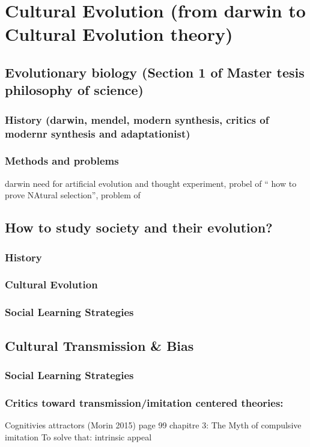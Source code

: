 \documentclass[12pt, b5paper,twoside]{tesi_upf}
\begin{document}
\section{Cultural Evolution (from darwin to Cultural Evolution theory)}
\subsection{ Evolutionary biology (Section 1 of Master tesis philosophy of science)}
\subsubsection{ History (darwin, mendel, modern synthesis, critics of modernr synthesis and adaptationist)}
\subsubsection{Methods and problems}
darwin need for artificial evolution and thought experiment, probel of `` how to prove NAtural selection'', problem of 
\subsection{How to study society and their evolution?}
\subsubsection{History}
\subsubsection{Cultural Evolution}
\subsubsection{Social Learning Strategies }
\subsection{Cultural Transmission \& Bias}
\subsubsection{ Social Learning Strategies}
\subsubsection{Critics toward transmission/imitation centered theories:}
Cognitivies attractors (Morin 2015) page 99 chapitre 3: The Myth of compulsive imitation
To solve that: intrinsic appeal
\end{document}
